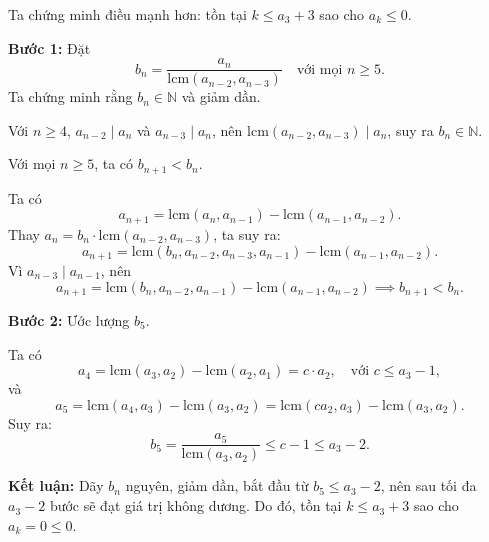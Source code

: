 \documentclass[../01-divisibility.tex]{subfiles}
\begin{document}
\begin{soln}\footnotemark
	Ta chứng minh điều mạnh hơn: tồn tại \( k \leq a_3 + 3 \) sao cho \( a_k \leq 0 \).

	\textbf{Bước 1:} Đặt
	\[
		b_n = \frac{a_n}{\text{lcm}(a_{n-2}, a_{n-3})} \quad \text{với mọi } n \geq 5.
	\]
	Ta chứng minh rằng \( b_n \in \mathbb{N} \) và giảm dần.

	Với \( n \geq 4 \), \( a_{n-2} \mid a_n \) và \( a_{n-3} \mid a_n \), nên \( \text{lcm}(a_{n-2}, a_{n-3}) \mid a_n \), suy ra \( b_n \in \mathbb{N} \).

	\begin{claim*}
		Với mọi \( n \geq 5 \), ta có \( b_{n+1} < b_n \).
	\end{claim*}
	\begin{subproof}
		Ta có
		\[
		a_{n+1} = \text{lcm}(a_n, a_{n-1}) - \text{lcm}(a_{n-1}, a_{n-2}).
		\]
		Thay \( a_n = b_n \cdot \text{lcm}(a_{n-2}, a_{n-3}) \), ta suy ra:
		\[
		a_{n+1} = \text{lcm}(b_n, a_{n-2}, a_{n-3}, a_{n-1}) - \text{lcm}(a_{n-1}, a_{n-2}).
		\]
		Vì \( a_{n-3} \mid a_{n-1} \), nên
		\[
		a_{n+1} = \text{lcm}(b_n, a_{n-2}, a_{n-1}) - \text{lcm}(a_{n-1}, a_{n-2}) \implies b_{n+1} < b_n.
		\]
	\end{subproof}

	\textbf{Bước 2:} Ước lượng \( b_5 \).

	Ta có
	\[
	a_4 = \text{lcm}(a_3, a_2) - \text{lcm}(a_2, a_1) = c \cdot a_2,\quad \text{với } c \leq a_3 - 1,
	\]
	và
	\[
	a_5 = \text{lcm}(a_4, a_3) - \text{lcm}(a_3, a_2) = \text{lcm}(c a_2, a_3) - \text{lcm}(a_3, a_2).
	\]
	Suy ra:
	\[
	b_5 = \frac{a_5}{\text{lcm}(a_3, a_2)} \leq c - 1 \leq a_3 - 2.
	\]

	\textbf{Kết luận:} Dãy \( b_n \) nguyên, giảm dần, bắt đầu từ \( b_5 \leq a_3 - 2 \), nên sau tối đa \( a_3 - 2 \) bước sẽ đạt giá trị không dương. Do đó, tồn tại \( k \leq a_3 + 3 \) sao cho \( a_k = 0 \leq 0 \).
\end{soln}

\end{document}
